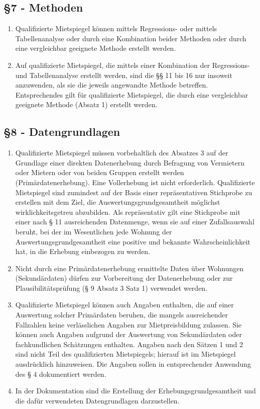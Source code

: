     \subsection{\S7 - Methoden}
    \begin{enumerate}[label=(\arabic*)]
        \item Qualifizierte Mietspiegel können mittels Regressions- oder mittels Tabellenanalyse oder durch eine Kombination beider Methoden oder durch eine vergleichbar geeignete Methode erstellt werden.
        \item Auf qualifizierte Mietspiegel, die mittels einer Kombination der Regressions- und Tabellenanalyse erstellt werden, sind die §§ 11 bis 16 nur insoweit anzuwenden, als sie die jeweils angewandte Methode betreffen. Entsprechendes gilt für qualifizierte Mietspiegel, die durch eine vergleichbar geeignete Methode (Absatz 1) erstellt werden. 
    \end{enumerate}
    \subsection{\S8 - Datengrundlagen}
    \begin{enumerate}
        \item Qualifizierte Mietspiegel müssen vorbehaltlich des Absatzes 3 auf der Grundlage einer direkten Datenerhebung durch Befragung von Vermietern oder Mietern oder von beiden Gruppen erstellt werden (Primärdatenerhebung). Eine Vollerhebung ist nicht erforderlich. Qualifizierte Mietspiegel sind zumindest auf der Basis einer repräsentativen Stichprobe zu erstellen mit dem Ziel, die Auswertungsgrundgesamtheit möglichst wirklichkeitsgetreu abzubilden. Als repräsentativ gilt eine Stichprobe mit einer nach § 11 ausreichenden Datenmenge, wenn sie auf einer Zufallsauswahl beruht, bei der im Wesentlichen jede Wohnung der Auswertungsgrundgesamtheit eine positive und bekannte Wahrscheinlichkeit hat, in die Erhebung einbezogen zu werden.
        \item Nicht durch eine Primärdatenerhebung ermittelte Daten über Wohnungen (Sekundärdaten) dürfen zur Vorbereitung der Datenerhebung oder zur Plausibilitätsprüfung (§ 9 Absatz 3 Satz 1) verwendet werden.
        \item Qualifizierte Mietspiegel können auch Angaben enthalten, die auf einer Auswertung solcher Primärdaten beruhen, die mangels ausreichender Fallzahlen keine verlässlichen Angaben zur Mietpreisbildung zulassen. Sie können auch Angaben aufgrund der Auswertung von Sekundärdaten oder fachkundlichen Schätzungen enthalten. Angaben nach den Sätzen 1 und 2 sind nicht Teil des qualifizierten Mietspiegels; hierauf ist im Mietspiegel ausdrücklich hinzuweisen. Die Angaben sollen in entsprechender Anwendung des § 4 dokumentiert werden.
        \item In der Dokumentation sind die Erstellung der Erhebungsgrundgesamtheit und die dafür verwendeten Datengrundlagen darzustellen.
    \end{enumerate}
